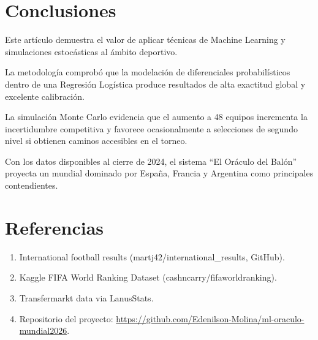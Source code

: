 \documentclass[conference]{IEEEtran}
\begin{document}
	\section{Conclusiones}
	
	Este artículo demuestra el valor de aplicar técnicas de Machine Learning y simulaciones estocásticas al ámbito deportivo.
	
	La metodología comprobó que la modelación de diferenciales probabilísticos dentro de una Regresión Logística produce resultados de alta exactitud global y excelente calibración.
	
	La simulación Monte Carlo evidencia que el aumento a 48 equipos incrementa la incertidumbre competitiva y favorece ocasionalmente a selecciones de segundo nivel si obtienen caminos accesibles en el torneo.
	
	Con los datos disponibles al cierre de 2024, el sistema ``El Oráculo del Balón'' proyecta un mundial dominado por España, Francia y Argentina como principales contendientes.
	
	\section*{Referencias}
	
	\begin{enumerate}
		\item International football results (martj42/international\_results, GitHub).
		\item Kaggle FIFA World Ranking Dataset (cashncarry/fifaworldranking).
		\item Transfermarkt data via LanusStats.
		\item Repositorio del proyecto: \href{https://github.com/Edenilson-Molina/ml-oraculo-mundial2026.git}{https://github.com/Edenilson-Molina/ml-oraculo-mundial2026}.
	\end{enumerate}
	
\end{document}
